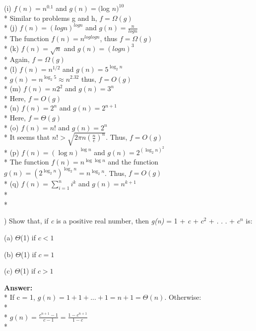 \documentclass{article}
\begin{document}
\indent (i) $f(n) = n^0.1$ and $g(n) = ($log $n)^{10}$\\*
\indent \indent Similar to problems g and h, $f = \Omega(g)$\\*
\indent (j) $f(n) = (logn)^{logn}$ and $g(n) = \frac{n}{logn}$\\*
\indent \indent The function $f(n) = n^{loglogn}$, thus $f = \Omega(g)$\\*
\indent (k) $f(n) = \sqrt{n}$ and $g(n) = (logn)^3$\\*
\indent \indent Again, $f = \Omega(g)$\\*
\indent (l) $f(n) = n^{1/2}$ and $g(n) = 5^{\log_2 n}$\\*
\indent \indent $g(n) = n^{\log_2 5} \approx  n^{2.32}$ thus, $f = O(g)$\\*
\indent (m) $f(n) = n2^2$ and $g(n) = 3^n$\\*
\indent \indent Here, $f = O(g)$\\*
\indent (n) $f(n) = 2^n$ and $g(n) = 2^{n + 1}$\\*
\indent \indent Here, $f = \Theta(g)$\\*
\indent (o) $f(n) = n!$ and $g(n) = 2^n$\\*
\indent \indent It seems that $n! > \sqrt{2\pi n(\frac{n}{e})^n}$. Thus, $f = O(g)$\\*
\indent (p) $f(n) = (\log n)^{\log n}$ and $g(n) = 2^{({\log_2 n})^2}$\\*
\indent \indent The function $f(n) = n^{\log \log n}$ and the function $g(n) = (2^{\log_2 n})^{\log_2 n} = n^{\log_2 n}$. Thus, $f = O(g)$\\*
\indent (q) $f(n) = \sum\limits_{i=1}^n i^k$ and $g(n) = n^{k + 1}$\\*
\indent \indent  \\*  %

\vspace{.5in}
) Show that, if \textit{c} is a positive real number, then \textit{g(n)} = 1 + \textit{c} + $c^2$ + . . . + 
\indent$c^n$ is:

\vspace{.1in}
\indent (a) $\Theta$(1) if $c < 1$

\indent (b) $\Theta$(1) if $c = 1$

\indent (c) $\Theta$(1) if $c > 1$

\vspace{.1in}
{\bf Answer:}
\\* \indent If c = 1, $g(n) = 1 + 1 + . . .  + 1 = n + 1 = \Theta(n)$. Otherwise:
\\* \\* \indent \indent \indent $g(n) = \frac{c^{n + 1} - 1}{c - 1} = \frac{1 - c^{n + 1}}{1 - c}$ \\* 
\end{document}
